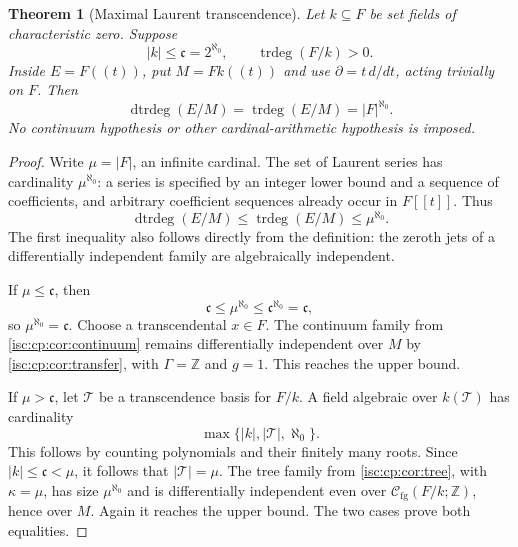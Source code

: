 \documentclass[11pt,letterpaper]{article}
\newtheorem{theorem}{Theorem}[section]
\newtheorem{corollary}[theorem]{Corollary}
\theoremstyle{definition}
\theoremstyle{remark}
\newcommand{\R}{\mathbb R}
\newcommand{\C}{\mathbb C}
\newcommand{\Q}{\mathbb Q}
\newcommand{\Z}{\mathbb Z}
\newcommand{\trdeg}{\operatorname{trdeg}}
\newcommand{\cc}{\mathfrak c}
\newcommand{\dtrdeg}{\operatorname{dtrdeg}}
\newcommand{\Cfg}{\mathcal C_{\mathrm{fg}}}
\numberwithin{equation}{section}
\begin{document}
\begin{theorem}[Maximal Laurent transcendence]\label{isc:cp:thm:cardinal}
Let $k\subseteq F$ be set fields of characteristic zero. Suppose
\[
 |k|\le\cc=2^{\aleph_0},\qquad \trdeg(F/k)>0.
\]
Inside $E=F((t))$, put $M=F k((t))$ and use $\partial=t\,d/dt$, acting
trivially on $F$. Then
\begin{equation}\label{isc:cp:eq:cardinalmain}
 \boxed{\quad\dtrdeg(E/M)=\trdeg(E/M)=|F|^{\aleph_0}.\quad}
\end{equation}
No continuum hypothesis or other cardinal-arithmetic hypothesis is imposed.
\end{theorem}
\begin{proof}
Write $\mu=|F|$, an infinite cardinal. The set of Laurent series has
cardinality $\mu^{\aleph_0}$: a series is specified by an integer lower
bound and a sequence of coefficients, and arbitrary coefficient sequences
already occur in $F[[t]]$. Thus
\[
 \dtrdeg(E/M)\le\trdeg(E/M)\le\mu^{\aleph_0}.
\]
The first inequality also follows directly from the definition: the zeroth
jets of a differentially independent family are algebraically independent.

If $\mu\le\cc$, then
\[
 \cc\le\mu^{\aleph_0}\le\cc^{\aleph_0}=\cc,
\]
so $\mu^{\aleph_0}=\cc$. Choose a transcendental $x\in F$. The continuum
family from \cref{isc:cp:cor:continuum} remains differentially independent
over $M$ by \cref{isc:cp:cor:transfer}, with $\Gamma=\Z$ and $g=1$. This
reaches the upper bound.

If $\mu>\cc$, let $\mathcal T$ be a transcendence basis for $F/k$. A field
algebraic over $k(\mathcal T)$ has cardinality
\[
 \max\{|k|,|\mathcal T|,\aleph_0\}.
\]
This follows by counting polynomials and their finitely many roots. Since
$|k|\le\cc<\mu$, it follows that $|\mathcal T|=\mu$. The tree family from
\cref{isc:cp:cor:tree}, with $\kappa=\mu$, has size $\mu^{\aleph_0}$ and is
differentially independent even over $\Cfg(F/k;\Z)$, hence over $M$. Again
it reaches the upper bound. The two cases prove both equalities.
\end{proof}

\end{document}

